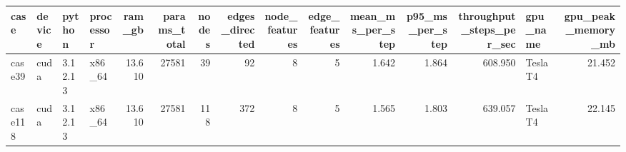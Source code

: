 \begin{tabular}{llllrrrrrrrrrlr}
\toprule
case & device & python & processor & ram_gb & params_total & nodes & edges_directed & node_features & edge_features & mean_ms_per_step & p95_ms_per_step & throughput_steps_per_sec & gpu_name & gpu_peak_memory_mb \\
\midrule
case39 & cuda & 3.12.13 & x86_64 & 13.610 & 27581 & 39 & 92 & 8 & 5 & 1.642 & 1.864 & 608.950 & Tesla T4 & 21.452 \\
case118 & cuda & 3.12.13 & x86_64 & 13.610 & 27581 & 118 & 372 & 8 & 5 & 1.565 & 1.803 & 639.057 & Tesla T4 & 22.145 \\
\bottomrule
\end{tabular}
